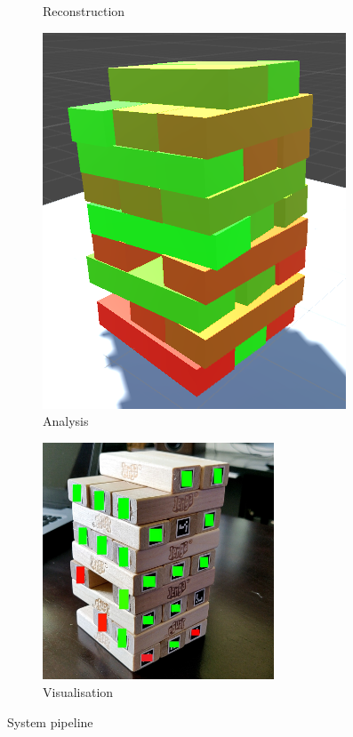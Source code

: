 \begin{figure}[p]
\begin{subfigure}{0.3\textwidth}
\caption{Reconstruction} \label{fig:d}
\end{subfigure}
\hspace*{\fill}

\medskip

\hspace*{\fill}
\begin{subfigure}{0.3\textwidth}
\includegraphics[width=\linewidth,keepaspectratio]{images/implementation/analysisportrait}
\caption{Analysis} \label{fig:e}
\end{subfigure}
\hspace*{\fill}
\begin{subfigure}{0.3\textwidth}
\includegraphics[width=\linewidth,height=200pt,keepaspectratio]{images/implementation/display}
\caption{Visualisation} \label{fig:f}
\end{subfigure}
\hspace*{\fill}

\caption{System pipeline} \label{fig:pipeline}
\end{figure}